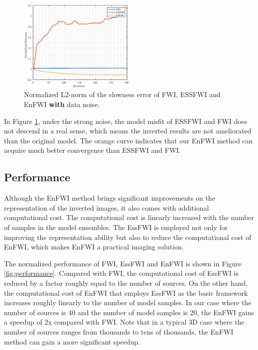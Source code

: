 \documentclass[mreferee]{gji}
\begin{document}
\begin{figure}
\center
\includegraphics[width=0.5\textwidth]{fig/model_fit_noise.eps}
\caption{Normalized L2-norm of the slowness error of FWI, ESSFWI and EnFWI \textbf{with} data noise.}
\label{fig:l2norm_noise}
\end{figure}


In Figure \ref{fig:l2norm_noise}, under the strong noise, the model misfit of ESSFWI and FWI does not descend in a real sense, which means the inverted results are not ameliorated than the original model. The orange curve indicates that our EnFWI method can acquire much better convergence than ESSFWI and FWI.

\subsection{Performance}

Although the EnFWI method brings significant improvements on the representation of the inverted images, it also comes with additional computational cost. The computational cost is linearly increased with the number of samples in the model ensembles. The EssFWI is employed not only for improving the representation ability but also to reduce the computational cost of EnFWI, which makes EnFWI a practical imaging solution.

The normalized performance of FWI, EssFWI and EnFWI is shown in Figure \ref{fig:performance}. Compared with FWI, the computational cost of EssFWI is reduced by a factor roughly equal to the number of sources. On the other hand, the computational cost of EnFWI that employs EssFWI as the basic framework increases roughly linearly to the number of model samples. In our case where the number of sources is 40 and the number of model samples is 20, the EnFWI gains a speedup of 2x compared with FWI. Note that in a typical 3D case where the number of sources ranges from thousands to tens of thousands, the EnFWI method can gain a more significant speedup.
\end{document}
